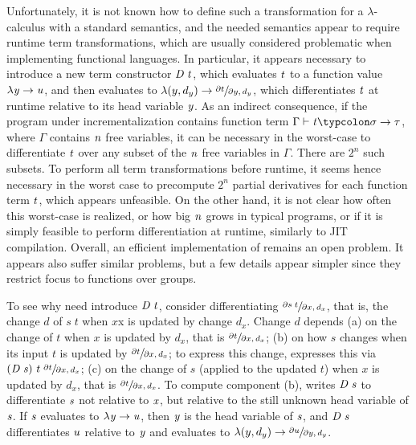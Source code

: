 Unfortunately, it is not known how to define such a
transformation for a $\lambda$-calculus with a standard
semantics, and the needed semantics appear to require runtime
term transformations, which are usually considered problematic
when implementing functional languages.
In particular, it appears necessary to introduce a new term
constructor \ensuremath{\Conid{D}\;\Varid{t}}, which evaluates \ensuremath{\Varid{t}} to a function value \ensuremath{\lambda \Varid{y}\to \Varid{u}}, and then evaluates to $\lambda (y, d_y) \to \sfrac{\partial
t}{\partial y, d_y}$, which differentiates \ensuremath{\Varid{t}} at runtime
relative to its head variable \ensuremath{\Varid{y}}. As an indirect consequence, if the
program under incrementalization contains function term \ensuremath{\Gamma\vdash\Varid{t}\typcolon\sigma\to \tau}, where \ensuremath{\Gamma} contains \ensuremath{\Varid{n}} free variables, it
can be necessary in the worst-case to differentiate \ensuremath{\Varid{t}} over any
subset of the \ensuremath{\Varid{n}} free variables in \ensuremath{\Gamma}. There are $2^n$ such
subsets. To perform all term transformations before runtime, it
seems hence necessary in the worst case to precompute $2^n$
partial derivatives for each function term \ensuremath{\Varid{t}}, which appears
unfeasible.
On the other hand, it is not clear how often this worst-case is
realized, or how big \ensuremath{\Varid{n}} grows in typical programs, or if it is
simply feasible to perform differentiation at runtime, similarly
to JIT compilation. Overall, an efficient implementation of
\ldiff{} remains an open problem.
It appears also \citet{Koch2016incremental}
suffer similar problems, but a few details appear simpler since
they restrict focus to functions over groups.

To see why \ldiff{} need introduce \ensuremath{\Conid{D}\;\Varid{t}}, consider
differentiating $\sfrac{\partial s\;t}{\partial x, d_x}$, that is,
the change $d$ of $s\;t$ when $x$x is updated by change $d_x$.
Change $d$ depends (a) on the change of $t$ when $x$ is updated
by $d_x$, that is
$\sfrac{\partial t}{\partial x, d_x}$;
(b) on how $s$ changes when its input $t$ is updated by
$\sfrac{\partial t}{\partial x, d_x}$; to express this change, \ldiff{}
expresses this via $(\mathit{D}\;\mathit{s})\;\mathit{t}\; \sfrac{\partial t}{\partial x, d_x}$;
(c) on the change of $s$ (applied to the updated $t$) when $x$ is
updated by $d_x$, that is $\sfrac{\partial t}{\partial x, d_x}$.
To compute component (b), \ldiff{} writes \ensuremath{\Conid{D}\;\Varid{s}} to
differentiate \ensuremath{\Varid{s}} not relative to \ensuremath{\Varid{x}}, but relative to the still unknown head
variable of \ensuremath{\Varid{s}}.
If \ensuremath{\Varid{s}} evaluates to \ensuremath{\lambda \Varid{y}\to \Varid{u}}, then \ensuremath{\Varid{y}} is the head variable of \ensuremath{\Varid{s}}, and \ensuremath{\Conid{D}\;\Varid{s}}
differentiates \ensuremath{\Varid{u}} relative to \ensuremath{\Varid{y}} and evaluates to $\lambda (y, d_y) \to
\sfrac{\partial u}{\partial y, d_y}$.

